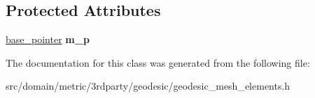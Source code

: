 \subsection*{Protected Attributes}
\begin{DoxyCompactItemize}
\item 
\hypertarget{classgeodesic_1_1_surface_point_a61b8608e699a1de26783f389b2cd45da}{}\hyperlink{classgeodesic_1_1_mesh_element_base}{base\+\_\+pointer} {\bfseries m\+\_\+p}\label{classgeodesic_1_1_surface_point_a61b8608e699a1de26783f389b2cd45da}

\end{DoxyCompactItemize}


The documentation for this class was generated from the following file\+:\begin{DoxyCompactItemize}
\item 
src/domain/metric/3rdparty/geodesic/geodesic\+\_\+mesh\+\_\+elements.\+h\end{DoxyCompactItemize}
